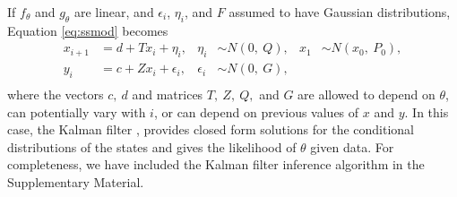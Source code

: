\documentclass[aoas]{imsart}
\DeclareRobustCommand{\varx}{{\mathpalette\irchi\relax}}
\newcommand{\irchi}[2]{\protect\raisebox{\depth}{$#1\upchi$}}
\begin{document}
If $f_\theta$ and $g_\theta$ are linear, and $\epsilon_i$,
$\eta_i$, and $F$ assumed to have Gaussian distributions, Equation \eqref{eq:ssmod} becomes
\begin{equation}
  \begin{aligned}
    x_{i+1}&= d+T x_i + \eta_{i}, 
    & \eta_i &\sim N(0,\ Q),     
    &x_1 &\sim N(x_0,\ P_0),\\
    y_i&= c + Z x_i + \epsilon_i,     
    & \epsilon_i &\sim N(0,\ G), \\
  \end{aligned}
  \label{eq:lgmod}
\end{equation}
where the vectors $c,\ d$ and matrices $T,\ Z,\ Q,$ and $G$ are allowed to depend
on $\theta$, can potentially vary with $i$, or can depend on previous
values of $x$ and $y$. In this case,
the Kalman filter %
\citep[see for example,][]{Kalman1960,Harvey1990},
provides closed form 
solutions for the conditional
distributions of the states and gives the likelihood of $\theta$
given data. For completeness, we have included the Kalman filter
inference algorithm in
the Supplementary Material.%
\end{document}

